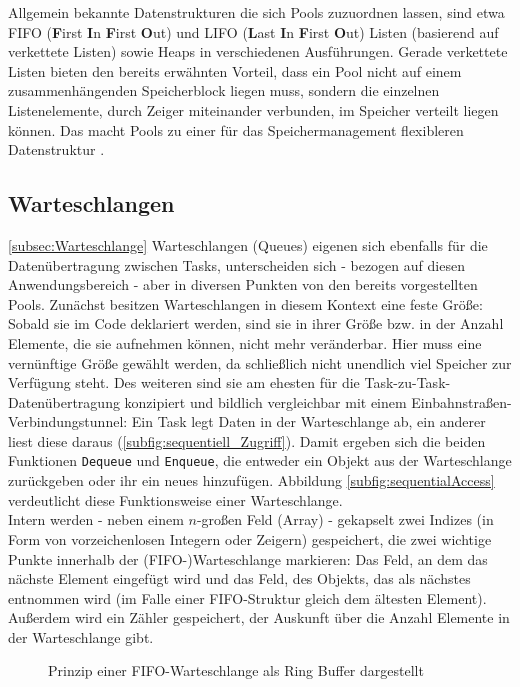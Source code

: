 \documentclass{llncs}
\begin{document}
Allgemein bekannte Datenstrukturen die sich Pools zuzuordnen lassen, sind etwa FIFO (\textbf{F}irst \textbf{I}n \textbf{F}irst \textbf{O}ut) und LIFO (\textbf{L}ast \textbf{I}n \textbf{F}irst \textbf{O}ut) Listen (basierend auf verkettete Listen) sowie Heaps in verschiedenen Ausführungen. Gerade verkettete Listen bieten den bereits erwähnten Vorteil, dass ein Pool nicht auf einem zusammenhängenden Speicherblock liegen muss, sondern die einzelnen Listenelemente, durch Zeiger miteinander verbunden, im Speicher verteilt liegen können. Das macht Pools zu einer für das Speichermanagement flexibleren Datenstruktur \autocite[vgl.][96]{Cooling2017}.

\subsection{Warteschlangen}
\ref{subsec:Warteschlange}
Warteschlangen (Queues) eigenen sich ebenfalls für die Datenübertragung zwischen Tasks, unterscheiden sich - bezogen auf diesen Anwendungsbereich - aber in diversen Punkten von den bereits vorgestellten Pools. Zunächst besitzen Warteschlangen in diesem Kontext eine feste Größe: Sobald sie im Code deklariert werden, sind sie in ihrer Größe bzw. in der Anzahl Elemente, die sie aufnehmen können, nicht mehr veränderbar. Hier muss eine vernünftige Größe gewählt werden, da schließlich nicht unendlich viel Speicher zur Verfügung steht. Des weiteren sind sie am ehesten für die Task-zu-Task-Datenübertragung konzipiert und bildlich vergleichbar mit einem Einbahnstraßen-Verbindungstunnel: Ein Task legt Daten in der Warteschlange ab, ein anderer liest diese daraus (\ref{subfig:sequentiell_Zugriff}). Damit ergeben sich die beiden Funktionen \texttt{Dequeue} und \texttt{Enqueue}, die entweder ein Objekt aus der Warteschlange zurückgeben oder ihr ein neues hinzufügen. Abbildung \ref{subfig:sequentialAccess} verdeutlicht diese Funktionsweise einer Warteschlange.\\

Intern werden - neben einem $n$-großen Feld (Array) - gekapselt zwei Indizes (in Form von vorzeichenlosen Integern oder Zeigern) gespeichert, die zwei wichtige Punkte innerhalb der (FIFO-)Warteschlange markieren: Das Feld, an dem das nächste Element eingefügt wird und das Feld, des Objekts, das als nächstes entnommen wird (im Falle einer FIFO-Struktur gleich dem ältesten Element). Außerdem wird ein Zähler gespeichert, der Auskunft über die Anzahl Elemente in der Warteschlange gibt.

\begin{figure}
	\centering
	\def\svgwidth{0.30\columnwidth}
	
	\caption{\label{fig:RingBuffer}Prinzip einer FIFO-Warteschlange als Ring Buffer dargestellt \autocite[vgl.][97]{Cooling2017}}
\end{figure}
\end{document}
